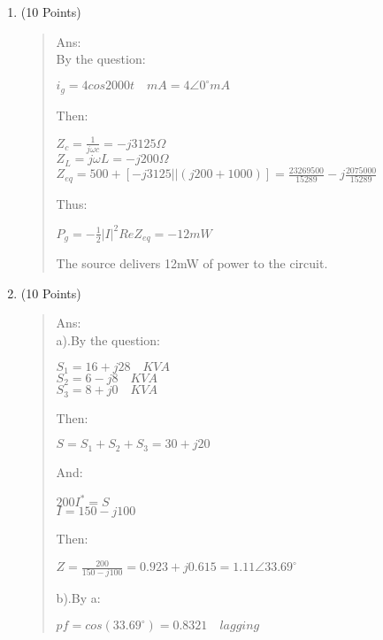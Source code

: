 \documentclass[12pt,a4paper]{article}
\begin{document}
\begin{enumerate}
		\item (10 Points)
		\begin{quote}
			Ans:\\
			By the question:
			\begin{center}
				$i_g=4cos2000t \quad mA = 4\angle0^\circ mA$
			\end{center}
			Then:
			\begin{center}
				$Z_c=\frac{1}{j\omega c}=-j3125\Omega$\\
				$Z_L=j\omega L=-j200\Omega$\\
				$Z_{eq}=500+[-j3125||(j200+1000)]=\frac{23269500}{15289}-j\frac{2075000}{15289}$
			\end{center}
		 Thus:
		\begin{center}
			$P_g=-\frac{1}{2}|I|^2Re{Z_{eq}}=-12mW$
		\end{center}
		The source delivers 12mW of power to the circuit.
		\end{quote}
	
		\clearpage
		\item (10 Points)
		\begin{quote}
			Ans:\\
			a).By the question:
			\begin{center}
				$S_1=16+j28  \quad KVA$\\
				$S_2=6-j8  \quad KVA$\\
				$S_3=8+j0 \quad KVA$
			\end{center}
		Then:
		\begin{center}
			$S=S_1+S_2+S_3=30+j20$
		\end{center}
		And:
		\begin{center}
			$200I^*=S$\\
			$I=150-j100$
		\end{center}
	 	Then:
	 	\begin{center}
	 		$Z=\frac{200}{150-j100}=0.923+j0.615=1.11\angle33.69^\circ$
	 	\end{center}
 		b).By a:
 		\begin{center}
 			$pf=cos(33.69^\circ)=0.8321 \quad lagging$
 		\end{center}	
		\end{quote}
		

\end{enumerate}
\end{document}
